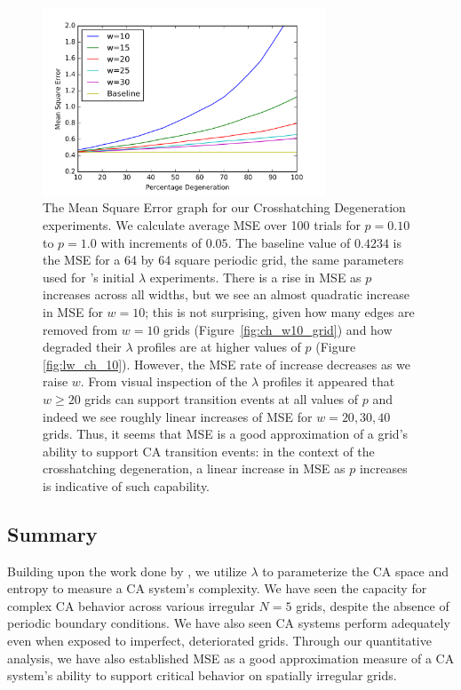\documentclass[a4paper,11pt]{article}
\begin{document}
\begin{figure}[htp]
\centering
\includegraphics[width=0.75\textwidth]{ch6_figs/ch_mse_10_30}
\caption[Mean Squared Error for Crosshatching Degeneration]{
  The Mean Square Error graph for our Crosshatching Degeneration experiments. We calculate average MSE over 100 trials for $p=0.10$ to $p=1.0$ with increments of $0.05$. The baseline value of $0.4234$ is the MSE for a 64 by 64 square periodic grid, the same parameters used for \citeauthor{wo90}'s initial $\lambda$ experiments. There is a rise in MSE as $p$ increases across all widths, but we see an almost quadratic increase in MSE for $w=10$; this is not surprising, given how many edges are removed from $w=10$ grids (Figure~\ref{fig:ch_w10_grid}) and how degraded their $\lambda$ profiles are at higher values of $p$ (Figure  \ref{fig:lw_ch_10}). However, the MSE rate of increase decreases as we raise $w$. From visual inspection of the $\lambda$ profiles it appeared that $w \ge 20$ grids can support transition events at all values of $p$ and indeed we see roughly linear increases of MSE for $w=20,30,40$ grids. Thus, it seems that MSE is a good approximation of a grid's ability to support CA transition events: in the context of the crosshatching degeneration, a linear increase in MSE as $p$ increases is indicative of such capability.
}
\label{fig:ch_mse}
\end{figure}

\subsection{Summary}

Building upon the work done by \citeauthor{wo90}, we utilize $\lambda$ to parameterize the CA space and entropy to measure a CA system's complexity. We have seen the capacity for complex CA behavior across various irregular $N=5$ grids, despite the absence of periodic boundary conditions. We have also seen CA systems perform adequately even when exposed to imperfect, deteriorated grids. Through our quantitative analysis, we have also established MSE as a good approximation measure of a CA system's ability to support critical behavior on spatially irregular grids.
\end{document}
